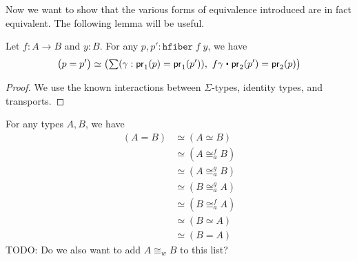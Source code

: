 Now we want to show that the various forms of equivalence introduced are in fact equivalent. The following lemma will be useful.

\begin{lem}\label{lem:hfib}
Let $f : A \to B$ and $y : B$. For any $p, p' : \mathtt{hfiber} \; f \;y$, we have
\[ \big(p = p'\big) \simeq \big(\sm{\gamma : \proj{1}(p) = \proj{1}(p')} f\gamma \ct \proj{2}(p') = \proj{2}(p) \big) \]
\end{lem}
\begin{proof}
We use the known interactions between $\Sigma$-types, identity types, and transports.
\end{proof}

\begin{thm}\label{thm:equivs-equiv}
For any types $A, B$, we have 
\begin{align*}
(A = B) & \simeq (A \simeq B) \\
       & \simeq (A\cong^f_a B) \\
       & \simeq (A\cong^g_a B) \\ 
        & \simeq (B\cong^g_a A) \\
        & \simeq (B\cong^f_a A) \\
        & \simeq (B \simeq A) \\
        & \simeq (B = A)
\end{align*}
TODO: Do we also want to add $A \cong_w B$ to this list?
\end{thm}

